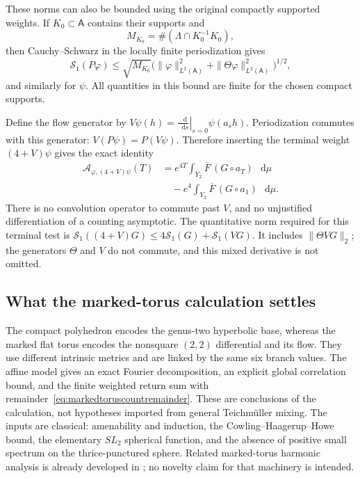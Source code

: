 \documentclass[11pt,a4paper]{article}
\numberwithin{equation}{section}
\theoremstyle{definition}
\theoremstyle{remark}
\newcommand{\dd}{\mathop{}\!\mathrm d}
\begin{document}
These norms can also be bounded using the original compactly
supported weights. If $K_0\subset \mathsf A$ contains their supports and
\[
 M_{K_0}=\#(\Lambda\cap K_0^{-1}K_0),
\]
then Cauchy--Schwarz in the locally finite periodization gives
\[
 \mathcal S_1(P\varphi)
  \leq\sqrt{M_{K_0}}
       \bigl(\|\varphi\|_{L^2(\mathsf A)}^2+
              \|\Theta\varphi\|_{L^2(\mathsf A)}^2\bigr)^{1/2},
\]
and similarly for $\psi$. All quantities in this bound are finite
for the chosen compact supports.

Define the flow generator by
$V\psi(h)=\left.\frac{\dd}{\dd s}\right|_{s=0}\psi(a_sh)$.
Periodization commutes with this generator:
$V(P\psi)=P(V\psi)$. Therefore inserting the terminal weight
$(4+V)\psi$ gives the exact identity
\begin{equation}
 \begin{split}
 \mathcal A_{\varphi,(4+V)\psi}(T)
  &=e^{4T}\int_{Y_2}\overline F\,(G\circ a_T)\,\dd\mu\\
  &\quad-e^4\int_{Y_2}\overline F\,(G\circ a_1)\,\dd\mu.
 \end{split}
 \label{eq:markedtorusderivativeweight}
\end{equation}
There is no convolution operator to commute past $V$, and no
unjustified differentiation of a counting asymptotic.
The quantitative norm required for this terminal test is
$\mathcal S_1((4+V)G)\leq4\mathcal S_1(G)+\mathcal S_1(VG)$.
It includes $\|\Theta VG\|_2$; the generators $\Theta$ and $V$
do not commute, and this mixed derivative is not omitted.


\subsection{What the marked-torus calculation settles}
\label{subsec:genus2torusscope}

The compact polyhedron encodes the genus-two hyperbolic base, whereas the
marked flat torus encodes the nonsquare $(2,2)$ differential and its flow.
They use different intrinsic metrics and are linked by the same six branch
values. The affine model gives an exact Fourier decomposition, an explicit
global correlation bound, and the finite weighted return sum with
remainder~\eqref{eq:markedtoruscountremainder}. These are conclusions of the
calculation, not hypotheses imported from general Teichm\"uller mixing.
The inputs are classical: amenability and induction, the
Cowling--Haagerup--Howe bound, the elementary $SL_2$ spherical function,
and the absence of positive small spectrum on the thrice-punctured sphere.
Related marked-torus harmonic analysis is already developed in
\cite{StrombergssonVishe,AthreyaLagaceMollerRaum}; no novelty claim for that
machinery is intended.
\end{document}
